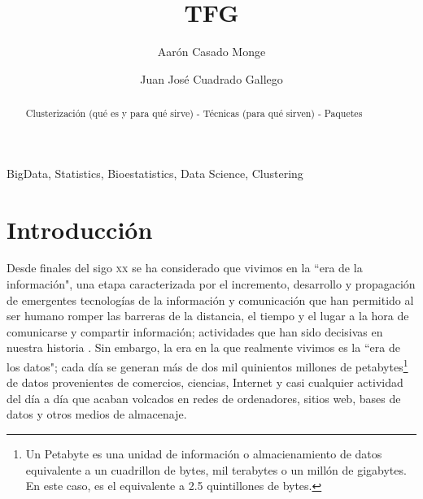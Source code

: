 \documentclass[3p,twocolumn]{elsarticle}
\begin{document}
\title{TFG} %

\author[1]{Aarón Casado Monge} %

\author[2]{Juan José Cuadrado Gallego} %

\address{University of Alcala, Polytechnic School, Computer Science Department, Scientific and Technological Campus, Politechnic Building. Office: O243, 28805, Alcala de Henares, Madrid, Spain}

\begin{abstract}
Clusterización (qué es y para qué sirve) - Técnicas (para qué sirven) - Paquetes 
\end{abstract}

\begin{keyword}
BigData, Statistics, Bioestatistics, Data Science, Clustering
\end{keyword}

\maketitle %
 
 
 
 
\section{Introducción}


Desde finales del sigo \textsc{xx} se ha considerado que vivimos en la ``era de la información", una etapa caracterizada por el incremento, desarrollo y propagación de emergentes tecnologías de la información y comunicación que han permitido al ser humano romper las barreras de la distancia, el tiempo y el lugar a la hora de comunicarse y compartir información; actividades que han sido decisivas en nuestra historia \cite{cita1}. Sin embargo, la era en la que realmente vivimos es la ``era de los datos"; cada día se generan más de dos mil quinientos millones de petabytes\footnote {Un Petabyte es una unidad de información o almacienamiento de datos equivalente a un cuadrillon de bytes, mil terabytes o un millón de gigabytes. En este caso, es el equivalente a 2.5 quintillones de bytes.} de datos provenientes de comercios, ciencias, Internet y casi cualquier actividad del día a día \cite{cita2} que acaban volcados en redes de ordenadores, sitios web, bases de datos y otros medios de almacenaje. 
\end{document}
